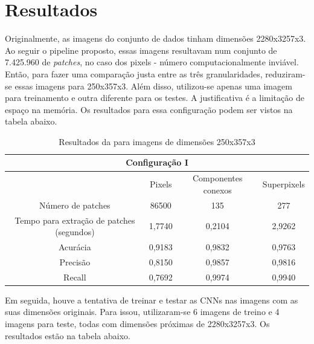 \documentclass{article}
\begin{document}
	\section{Resultados}
	
		Originalmente, as imagens do conjunto de dados tinham dimensões 2280x3257x3. Ao seguir o pipeline proposto, essas imagens resultavam num conjunto de 7.425.960 de \textit{patches}, no caso dos pixels - número computacionalmente inviável. Então, para fazer uma comparação justa entre as três granularidades, reduziram-se essas imagens para 250x357x3. Além disso, utilizou-se apenas uma imagem para treinamento e outra diferente para os testes. A justificativa é a limitação de espaço na memória. Os resultados para essa configuração podem ser vistos na tabela abaixo. 
		
		\begin{longtable}[c]{@{}cccc@{}}
			\caption[Resultados da configuração I]{Resultados da para imagens de dimensões 250x357x3} \\
			\toprule
			\multicolumn{4}{c}{Configuração I}                                                        \\* \midrule
			& Pixels & Componentes conexos & Superpixels \\* \midrule
			\endfirsthead
			\endhead
			\bottomrule
			\endfoot
			\endlastfoot
			Número de patches                         & 86500  & 135                 & 277         \\
			Tempo para extração de patches (segundos) & 1,7740 & 0,2104              & 2,9262      \\
			Acurácia                                  & 0,9183 & 0,9832              & 0,9763      \\
			Precisão                                  & 0,8150 & 0,9857              & 0,9816      \\
			Recall                                    & 0,7692 & 0,9974              & 0,9940      \\* \bottomrule
		\end{longtable}
	
	Em seguida, houve a tentativa de treinar e testar as CNNs nas imagens com as suas dimensões originais. Para issou, utilizaram-se 6 imagens de treino e 4 imagens para teste, todas com dimensões próximas de 2280x3257x3. Os resultados estão na tabela abaixo.
	
\end{document}
